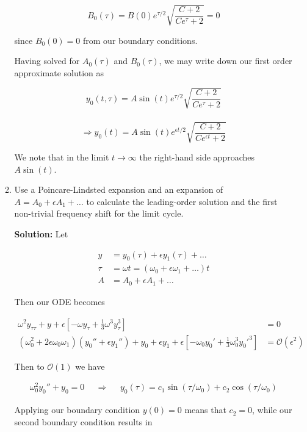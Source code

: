 \documentclass[12pt, a4paper]{article}
\begin{document}
\begin{enumerate}
\begin{enumerate}
    $$B_0(\tau) = B(0) e^{\tau/2} \sqrt{\frac{C +2}{Ce^{\tau}+2}} = 0$$

    since $B_0(0)=0$ from our boundary conditions.

    Having solved for $A_0(\tau)$ and $B_0(\tau)$, we may write down our first order approximate solution as 

    $$y_0(t,\tau) = A\sin (t) e^{\tau/2} \sqrt{\frac{C +2}{Ce^{\tau}+2}}$$\\
    $$\Rightarrow y_0(t) = A\sin (t) e^{\epsilon t/2} \sqrt{\frac{C +2}{Ce^{\epsilon t}+2}}$$

    We note that in the limit $t\rightarrow \infty$ the right-hand side approaches $A \sin(t)$.\\

    \item Use a Poincare-Lindsted expansion and an expansion of $A=A_0 + \epsilon A_1 + \dots$ to calculate the leading-order solution and the first non-trivial frequency shift for the limit cycle.

    \textbf{Solution:} Let 

    \begin{align*}
        y&=y_0(\tau) + \epsilon y_1(\tau) + \dots \\ \tau &= \omega t = (\omega_0 + \epsilon \omega_1 + \dots) t \\ A &= A_0 + \epsilon A_1 + \dots
    \end{align*}

    Then our ODE becomes

    \begin{align*}
        \omega^2 y_{\tau\tau} + y + \epsilon \left[-\omega y_\tau + \frac{1}{3} \omega^3 y_\tau^3 \right] &= 0 \\
        (\omega_0^2 + 2 \epsilon \omega_0 \omega_1)(y_{0}'' + \epsilon y_{1}'') + y_0 + \epsilon y_1 + \epsilon \left[ -\omega_0 y_0' + \frac{1}{3} \omega_0^3 {y_0'}^3\right]  &= \mathcal{O}(\epsilon^2)
    \end{align*}

    Then to $\mathcal{O}(1)$ we have

    \begin{align*}
        \omega_0^2 y_0'' + y_0 = 0 && \Rightarrow && y_0(\tau) = c_1 \sin(\tau/\omega_0) + c_2 \cos(\tau/\omega_0)
    \end{align*}

    Applying our boundary condition $y(0) = 0$ means that $c_2 =0$, while our second boundary condition results in


\end{enumerate}
\end{enumerate}
\end{document}
